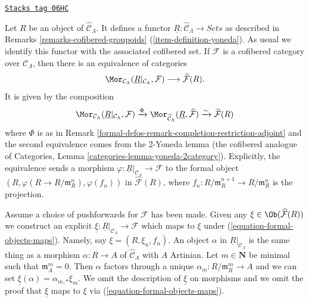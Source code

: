 \begin{remark}
\label{formal-defos-remark-formal-objects-yoneda}
\href{https://stacks.math.columbia.edu/tag/06HC}{\texttt{Stacks tag 06HC}}

Let $R$ be an object of $\widehat{\mathcal{C}}_\Lambda$.  It defines a functor
$\underline{R}: \widehat{\mathcal{C}}_\Lambda \to \textit{Sets}$
as described in
Remarks \ref{remarks-cofibered-groupoids} (\ref{item-definition-yoneda}).
As usual we identify this functor with the
associated cofibered set.  If $\mathcal{F}$ is a cofibered category over
$\mathcal{C}_\Lambda$, then there is an equivalence of categories
\begin{equation}
\label{equation-formal-objects-maps}
\Mor_{\mathcal{C}_\Lambda}(
\underline{R}|_{\mathcal{C}_\Lambda}, \mathcal{F})
\longrightarrow
\widehat{\mathcal{F}}(R).
\end{equation}
It is given by the composition
$$
\Mor_{\mathcal{C}_\Lambda}(
\underline{R}|_{\mathcal{C}_\Lambda}, \mathcal{F})
\xrightarrow{\Phi}
\Mor_{\widehat{\mathcal{C}}_\Lambda}(
\underline{R}, \widehat{\mathcal{F}})
\xrightarrow{\sim}
\widehat{\mathcal{F}}(R)
$$
where $\Phi$ is as in
Remark \ref{formal-defos-remark-completion-restriction-adjoint}
and the second equivalence comes from the 2-Yoneda lemma
(the cofibered analogue of
Categories, Lemma \ref{categories-lemma-yoneda-2category}).
Explicitly, the equivalence sends a morphism
$\varphi : \underline{R}|_{\mathcal{C}_\Lambda} \to \mathcal{F}$
to the formal object
$(R, \varphi(R \to R/\mathfrak{m}_R^n), \varphi(f_n))$ in
$\widehat{\mathcal{F}}(R)$, where
$f_n : R/\mathfrak m_R^{n + 1} \to R/\mathfrak m_R^n$ is the projection.

\medskip\noindent
Assume a choice of pushforwards for $\mathcal{F}$ has been made.
Given any $\xi \in \Ob(\widehat{\mathcal{F}}(R))$ we construct
an explicit
$\underline{\xi} : \underline{R}|_{\mathcal{C}_\Lambda} \to \mathcal{F}$
which maps to $\xi$ under (\ref{equation-formal-objects-maps}).
Namely, say $\xi = (R, \xi_n, f_n)$. An object $\alpha$ in
$\underline{R}|_{\mathcal{C}_\Lambda}$ is the same thing as a morphism
$\alpha : R \to A$ of $\widehat{\mathcal{C}}_\Lambda$ with $A$
Artinian. Let $m \in \mathbf{N}$ be minimal such that $\mathfrak m_A^m = 0$.
Then $\alpha$ factors through a unique $\alpha_m : R/\mathfrak m_R^m \to A$
and we can set $\underline{\xi}(\alpha) = \alpha_{m, *}\xi_m$.
We omit the description of $\underline{\xi}$ on morphisms and we
omit the proof that $\underline{\xi}$ maps to $\xi$
via (\ref{equation-formal-objects-maps}).


\end{remark}

